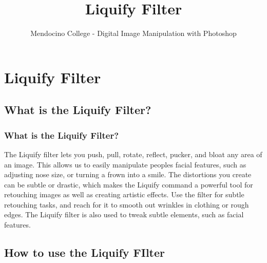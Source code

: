 \documentclass{beamer}
\title{Liquify Filter}
\author{Mendocino College - Digital Image Manipulation with Photoshop}
\date{\vspace{-5em}}
\begin{document}
	{
		\begin{frame}
			\vspace{-35pt}
			\maketitle
		\end{frame}
	}
		
		
\section{Liquify Filter}

\subsection{What is the Liquify Filter?}		

	\begin{frame}
		\frametitle{What is the Liquify Filter?}
		\begin{outline}
			\1 The Liquify filter lets you push, pull, rotate, reflect, pucker, and bloat any area of an image. 
			\1 This allows us to easily manipulate peoples facial features, such as adjusting nose size, or turning a frown into a smile.
			\1 The distortions you create can be subtle or drastic, which makes the Liquify command a powerful tool for retouching images as well as creating artistic effects. 
			\1 Use the filter for subtle retouching tasks, and reach for it to smooth out wrinkles in clothing or rough edges. 
			\1 The Liquify filter is also used to tweak subtle elements, such as facial features.
		\end{outline}
	\end{frame}

\subsection{How to use the Liquify FIlter}		
\end{document}
